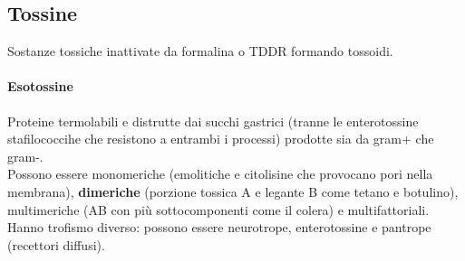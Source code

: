 \documentclass[10pt]{article}
\begin{document}
\subsection*{Tossine} Sostanze tossiche inattivate da formalina o TDDR formando tossoidi. 
\paragraph*{Esotossine} Proteine termolabili e distrutte dai succhi gastrici (tranne le enterotossine stafilococcihe che resistono a entrambi i processi) prodotte sia da gram+ che gram-. \\
Possono essere monomeriche (emolitiche e citolisine che provocano pori nella membrana), \textbf{dimeriche} (porzione tossica A e legante B come tetano e botulino), multimeriche (AB con più sottocomponenti come il colera) e multifattoriali.\\
Hanno trofismo diverso: possono essere neurotrope, enterotossine e pantrope (recettori diffusi).
\end{document}
